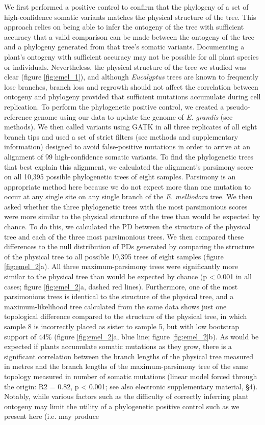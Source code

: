 We first performed a positive control to confirm that the phylogeny of a set of high-confidence somatic variants matches the physical structure of the tree. This approach relies on being able to infer the ontogeny of the tree with sufficient accuracy that a valid comparison can be made between the ontogeny of the tree and a phylogeny generated from that tree's somatic variants. Documenting a plant's ontogeny with sufficient accuracy may not be possible for all plant species or individuals. Nevertheless, the physical structure of the tree we studied was clear (figure \ref{fig:emel_1}), and although \textit{Eucalyptus} trees are known to frequently lose branches, branch loss and regrowth should not affect the correlation between ontogeny and phylogeny provided that sufficient mutations accumulate during cell replication. To perform the phylogenetic positive control, we created a pseudo-reference genome using our data to update the genome of \textit{E. grandis} (see methods). We then called variants using GATK \parencite{mckenna_genome_2010} in all three replicates of all eight branch tips and used a set of strict filters (see methods and supplementary information) designed to avoid false-positive mutations in order to arrive at an alignment of 99 high-confidence somatic variants. To find the phylogenetic trees that best explain this alignment, we calculated the alignment's parsimony score on all 10,395 possible phylogenetic trees of eight samples. Parsimony is an appropriate method here because we do not expect more than one mutation to occur at any single site on any single branch of the \textit{E. melliodora} tree. We then asked whether the three phylogenetic trees with the most parsimonious scores were more similar to the physical structure of the tree than would be expected by chance. To do this, we calculated the PD between the structure of the physical tree and each of the three most parsimonious trees. We then compared these differences to the null distribution of PDs generated by comparing the structure of the physical tree to all possible 10,395 trees of eight samples (figure \ref{fig:emel_2}a). All three maximum-parsimony trees were significantly more similar to the physical tree than would be expected by chance (p < 0.001 in all cases; figure \ref{fig:emel_2}a, dashed red lines). Furthermore, one of the most parsimonious trees is identical to the structure of the physical tree, and a maximum-likelihood tree calculated from the same data shows just one topological difference compared to the structure of the physical tree, in which sample 8 is incorrectly placed as sister to sample 5, but with low bootstrap support of 44\% (figure \ref{fig:emel_2}a, blue line; figure \ref{fig:emel_2}b). As would be expected if plants accumulate somatic mutations as they grow, there is a significant correlation between the branch lengths of the physical tree measured in metres and the branch lengths of the maximum-parsimony tree of the same topology measured in number of somatic mutations (linear model forced through the origin: R2 = 0.82, p < 0.001; see also electronic supplementary material, §4). Notably, while various factors such as the difficulty of correctly inferring plant ontogeny may limit the utility of a phylogenetic positive control such as we present here (i.e. may produce 